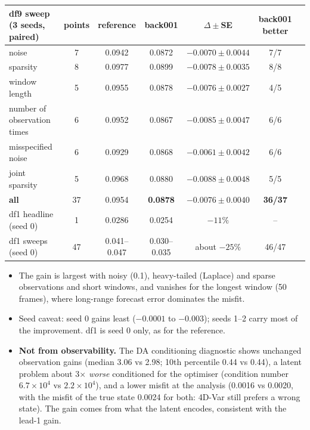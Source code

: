 \documentclass[10.5pt,a4paper]{article}
\begin{document}
\begin{center}\small
\begin{tabular}{lcccccc}
\toprule
df9 sweep (3 seeds, paired) & points & reference & back001 & $\Delta\pm$SE & back001 better\\
\midrule
noise & 7 & 0.0942 & 0.0872 & $-0.0070\pm0.0044$ & 7/7\\
sparsity & 8 & 0.0977 & 0.0899 & $-0.0078\pm0.0035$ & 8/8\\
window length & 5 & 0.0955 & 0.0878 & $-0.0076\pm0.0027$ & 4/5\\
number of observation times & 6 & 0.0952 & 0.0867 & $-0.0085\pm0.0047$ & 6/6\\
misspecified noise & 6 & 0.0929 & 0.0868 & $-0.0061\pm0.0042$ & 6/6\\
joint sparsity & 5 & 0.0968 & 0.0880 & $-0.0088\pm0.0048$ & 5/5\\
\midrule
\textbf{all} & 37 & 0.0954 & \textbf{0.0878} & $\mathbf{-0.0076\pm0.0040}$ & \textbf{36/37}\\
\midrule
df1 headline (seed 0) & 1 & 0.0286 & 0.0254 & $-11\%$ & --\\
df1 sweeps (seed 0) & 47 & 0.041--0.047 & 0.030--0.035 & about $-25\%$ & 46/47\\
\bottomrule
\end{tabular}
\end{center}

\begin{itemize}
\item The gain is largest with noisy (0.1), heavy-tailed (Laplace) and sparse observations and
  short windows, and vanishes for the longest window (50 frames), where long-range forecast
  error dominates the misfit.
\item Seed caveat: seed 0 gains least ($-0.0001$ to $-0.003$); seeds 1--2 carry most of the
  improvement. df1 is seed 0 only, as for the reference.
\item \textbf{Not from observability.} The DA conditioning diagnostic shows unchanged observation
  gains (median 3.06 vs 2.98; 10th percentile 0.44 vs 0.44), a latent problem about 3$\times$
  \emph{worse} conditioned for the optimiser (condition number $6.7\times10^4$ vs
  $2.2\times10^4$), and a lower misfit at the analysis (0.0016 vs 0.0020, with the misfit of the
  true state 0.0024 for both: 4D-Var still prefers a wrong state). The gain comes from what the
  latent encodes, consistent with the lead-1 gain.
\end{itemize}
\end{document}
